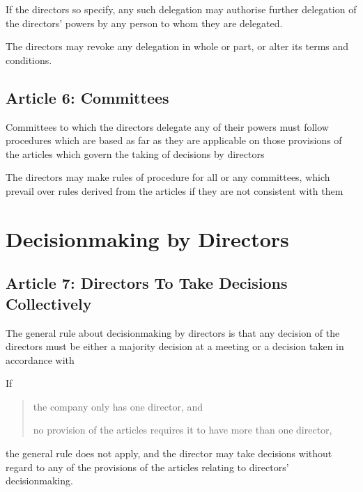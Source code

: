 \documentclass[letterpaper,10pt,openany,oneside,english]{sphinxmanual}
\begin{document}
 If the directors so specify, any such delegation may authorise further delegation of the directors’ powers by any person to whom they are delegated.

 The directors may revoke any delegation in whole or part, or alter its terms and conditions.


\subsection{Article 6: Committees}
\label{\detokenize{directors:article-6-committees}}\label{\detokenize{directors:article-6}}
 Committees to which the directors delegate any of their powers must follow procedures which are based as far as they are applicable on those provisions of the articles which govern the taking of decisions by directors

 The directors may make rules of procedure for all or any committees, which prevail over rules derived from the articles if they are not consistent with them


\section{Decisionmaking by Directors}
\label{\detokenize{directors:decisionmaking-by-directors}}

\subsection{Article 7: Directors To Take Decisions Collectively}
\label{\detokenize{directors:article-7-directors-to-take-decisions-collectively}}\label{\detokenize{directors:article-7}}
 The general rule about decisionmaking by directors is that any decision of the directors must be either a majority decision at a meeting or a decision taken in accordance with {\hyperref[\detokenize{directors:article-8}]{}}

 If
\begin{quote}

 the company only has one director, and

 no provision of the articles requires it to have more than one director,
\end{quote}

the general rule does not apply, and the director may take decisions without regard to any of the provisions of the articles relating to directors’ decisionmaking.
\end{document}
